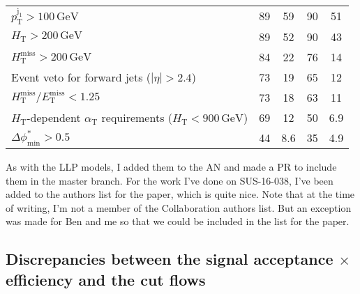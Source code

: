 \begin{table}[H]
{\begin{tabular}{lcccc}
   $p_{\mathrm{T}}^{\mathrm{j_1}} > 100\,\mathrm{GeV}$ & \phantom{1}89\phantom{.1} & \phantom{1}59\phantom{.1} & \phantom{1}90\phantom{.1} & \phantom{1}51\phantom{.1} \\
   $H_{\mathrm{T}} > 200\,\mathrm{GeV}$  & \phantom{1}89\phantom{.1} & \phantom{1}52\phantom{.1} & \phantom{1}90\phantom{.1} & \phantom{1}43\phantom{.1} \\
   $H_{\mathrm{T}}^{\mathrm{miss}} > 200\,\mathrm{GeV}$  & \phantom{1}84\phantom{.1} & \phantom{1}22\phantom{.1} & \phantom{1}76\phantom{.1} & \phantom{1}14\phantom{.1} \\
  Event veto for forward jets ($|\eta| > 2.4$) & \phantom{1}73\phantom{.1} & \phantom{1}19\phantom{.1} & \phantom{1}65\phantom{.1} & \phantom{1}12\phantom{.1} \\
  $H_{\mathrm{T}}^{\mathrm{miss}} / E_{\mathrm{T}}^{\mathrm{miss}} < 1.25$ & \phantom{1}73\phantom{.1} & \phantom{1}18\phantom{.1} & \phantom{1}63\phantom{.1} & \phantom{1}11\phantom{.1} \\
  $H_{\mathrm{T}}$-dependent $\alpha_{\mathrm{T}}$ requirements ($H_{\mathrm{T}} < 900\,\mathrm{GeV}$)  &  \phantom{1}69\phantom{.1} & \phantom{1}12\phantom{.1} & \phantom{1}50\phantom{.1} & \phantom{10}6.9 \\
  $\Delta\phi^{*}_{\mathrm{min}} > 0.5$  & \phantom{1}44\phantom{.1} & \phantom{10}8.6 & \phantom{1}35\phantom{.1} & \phantom{10}4.9 \\
  \hline
\end{tabular}
}
\end{table}

As with the LLP models, I added them to the AN and made a PR to include them in the master branch. For the work I've done on SUS-16-038, I've been added to the authors list for the paper, which is quite nice. Note that at the time of writing, I'm not a member of the Collaboration authors list. But an exception was made for Ben and me so that we could be included in the list for the paper.


\subsection{Discrepancies between the signal acceptance \texorpdfstring{$\times$}{x} efficiency and the cut flows}

